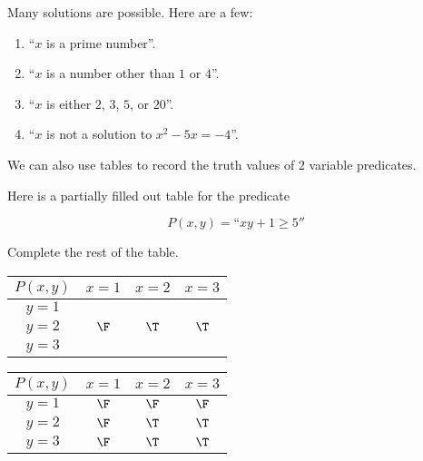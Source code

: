 \begin{solutions}
	Many solutions are possible.  Here are a few:
	
	\begin{enumerate}
		\item ``$x$ is a prime number''.
		\item ``$x$ is a number other than $1$ or $4$''.
		\item ``$x$ is either $2$, $3$, $5$, or $20$''.
		\item ``$x$ is not a solution to $x^2 - 5x = -4$''.
	\end{enumerate}
\end{solutions}

We can also use tables to record the truth values of $2$ variable predicates.  

\begin{xca}
	Here is a partially filled out table for the predicate
	
	\[P(x,y) = \textrm{``$xy + 1 \geq  5''$}\]
	
	Complete the rest of the table.
	
	\begin{table}[h!]
		\begin{center}
			\label{tab:table1}
			\begin{tabular}{c|c|c|c|}
				$ P(x,y)$        &$x=1$ & $x=2$ & $x=3$  \\
				\hline
				$y=1$ &    \hphantom{F}        &    \hphantom{F}        &      \hphantom{F}        \\
				\hline
				$y=2$ &    $\F$      &     $\T$      & $\T$        \\
				\hline
				$y=3$ &      \hphantom{F}      &      \hphantom{F}       &        \hphantom{F}      \\
				\hline
			\end{tabular}
		\end{center}
	\end{table}
	
\end{xca}


\begin{solutions}
	
	\begin{table}[h!]
		\begin{center}
			\label{tab:table1}
			\begin{tabular}{c|c|c|c|}
				$ P(x,y)$        &$x=1$ & $x=2$ & $x=3$  \\
				\hline
				$y=1$ &    $\F$      &     $\F$      & $\F$        \\
				\hline
				$y=2$ &    $\F$      &     $\T$      & $\T$        \\
				\hline
				$y=3$ &    $\F$      &     $\T$      & $\T$        \\
				\hline
			\end{tabular}
		\end{center}
	\end{table}
\end{solutions}

